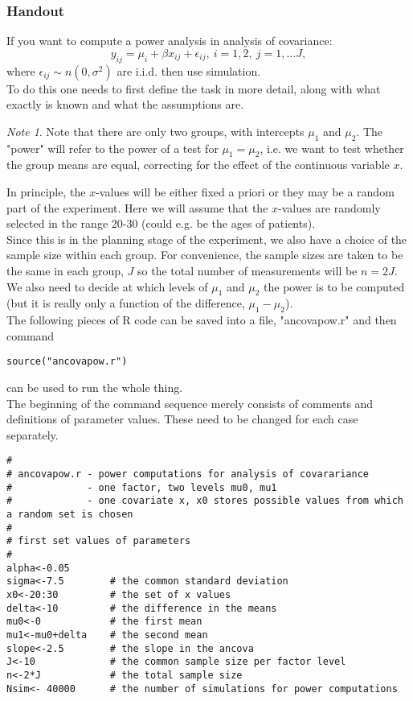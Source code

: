 \documentclass[12pt,a4paper]{article}
\theoremstyle{regla}
\theoremstyle{remark}
\newtheorem{notes}{Note}[section]
\theoremstyle{definition}
\theoremstyle{nonumberbreak}
\begin{document}
\subsubsection{Handout}
\begin{xmpl}
If you want to compute a power analysis in analysis of covariance:
$$
y_{ij}=\mu_i+\beta x_{ij}+\epsilon_{ij} , \ i=1, 2,\ j=1,\ldots J,
$$
where $\epsilon_{ij}\sim n(0,\sigma^ 2)$ are i.i.d. then use simulation. \\


To do this one needs to first define the task in more detail, along with what exactly is known and what the assumptions are. 

\begin{notes}
Note that there are only two groups, with intercepts $\mu_1$ and $\mu_2$.  The "power" will refer to the power of a test for $\mu_1=\mu_2$, 
i.e. we want to test whether the group means are equal, correcting for the effect of the continuous variable $x$.  
\end{notes}

In principle, the $x$-values will be either fixed a priori or they may be a random part of the experiment.  Here we will assume that the $x$-values are randomly selected in the range 20-30 (could e.g. be the ages of patients).\\

Since this is in the planning stage of the experiment, we also have a choice of the sample size within each group.  For convenience, the sample sizes are taken to be the same in each group, $J$ so the total number of measurements will be $n=2J$.  We also need to decide at which levels of $\mu_1$ and $\mu_2$ the power is to be computed (but it is really only a function of the difference, $\mu_1-\mu_2$).\\

The following pieces of R code can be saved into a file,  "ancovapow.r" and then command 
\begin{lstlisting}
source("ancovapow.r")
\end{lstlisting}
can be used to run the whole thing.\\

The beginning of the command sequence merely consists of comments and definitions of parameter values.  These need to be changed for each case separately.

\begin{lstlisting}
#
# ancovapow.r - power computations for analysis of covarariance
#             - one factor, two levels mu0, mu1
#             - one covariate x, x0 stores possible values from which a random set is chosen
#
# first set values of parameters
#
alpha<-0.05
sigma<-7.5        # the common standard deviation
x0<-20:30         # the set of x values
delta<-10         # the difference in the means
mu0<-0            # the first mean
mu1<-mu0+delta    # the second mean
slope<-2.5        # the slope in the ancova
J<-10             # the common sample size per factor level
n<-2*J            # the total sample size
Nsim<- 40000      # the number of simulations for power computations
\end{lstlisting}


\end{xmpl}
\end{document}

